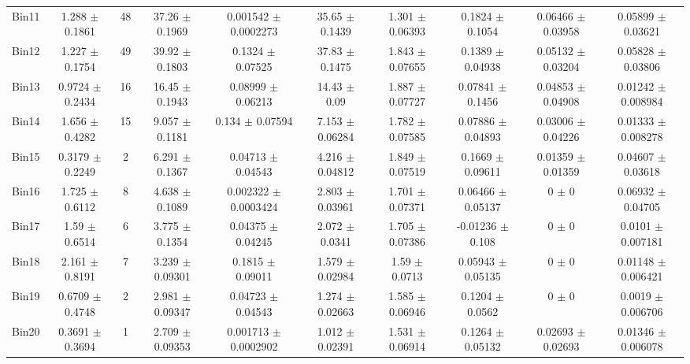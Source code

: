 \begin{tabular}{@{\extracolsep{4pt}}lccccccccc@{}}
     Bin11 & 1.288 $\pm$ 0.1861 & 48 & 37.26 $\pm$ 0.1969 & 0.001542 $\pm$ 0.0002273 & 35.65 $\pm$ 0.1439 & 1.301 $\pm$ 0.06393 & 0.1824 $\pm$ 0.1054 & 0.06466 $\pm$ 0.03958 & 0.05899 $\pm$ 0.03621 \\ 
     Bin12 & 1.227 $\pm$ 0.1754 & 49 & 39.92 $\pm$ 0.1803 & 0.1324 $\pm$ 0.07525 & 37.83 $\pm$ 0.1475 & 1.843 $\pm$ 0.07655 & 0.1389 $\pm$ 0.04938 & 0.05132 $\pm$ 0.03204 & 0.05828 $\pm$ 0.03806 \\ 
     Bin13 & 0.9724 $\pm$ 0.2434 & 16 & 16.45 $\pm$ 0.1943 & 0.08999 $\pm$ 0.06213 & 14.43 $\pm$ 0.09 & 1.887 $\pm$ 0.07727 & 0.07841 $\pm$ 0.1456 & 0.04853 $\pm$ 0.04908 & 0.01242 $\pm$ 0.008984 \\ 
     Bin14 & 1.656 $\pm$ 0.4282 & 15 & 9.057 $\pm$ 0.1181 & 0.134 $\pm$ 0.07594 & 7.153 $\pm$ 0.06284 & 1.782 $\pm$ 0.07585 & 0.07886 $\pm$ 0.04893 & 0.03006 $\pm$ 0.04226 & 0.01333 $\pm$ 0.008278 \\ 
     Bin15 & 0.3179 $\pm$ 0.2249 & 2 & 6.291 $\pm$ 0.1367 & 0.04713 $\pm$ 0.04543 & 4.216 $\pm$ 0.04812 & 1.849 $\pm$ 0.07519 & 0.1669 $\pm$ 0.09611 & 0.01359 $\pm$ 0.01359 & 0.04607 $\pm$ 0.03618 \\ 
     Bin16 & 1.725 $\pm$ 0.6112 & 8 & 4.638 $\pm$ 0.1089 & 0.002322 $\pm$ 0.0003424 & 2.803 $\pm$ 0.03961 & 1.701 $\pm$ 0.07371 & 0.06466 $\pm$ 0.05137 & 0 $\pm$ 0 & 0.06932 $\pm$ 0.04705 \\ 
     Bin17 & 1.59 $\pm$ 0.6514 & 6 & 3.775 $\pm$ 0.1354 & 0.04375 $\pm$ 0.04245 & 2.072 $\pm$ 0.0341 & 1.705 $\pm$ 0.07386 & -0.01236 $\pm$ 0.108 & 0 $\pm$ 0 & 0.0101 $\pm$ 0.007181 \\ 
     Bin18 & 2.161 $\pm$ 0.8191 & 7 & 3.239 $\pm$ 0.09301 & 0.1815 $\pm$ 0.09011 & 1.579 $\pm$ 0.02984 & 1.59 $\pm$ 0.0713 & 0.05943 $\pm$ 0.05135 & 0 $\pm$ 0 & 0.01148 $\pm$ 0.006421 \\ 
     Bin19 & 0.6709 $\pm$ 0.4748 & 2 & 2.981 $\pm$ 0.09347 & 0.04723 $\pm$ 0.04543 & 1.274 $\pm$ 0.02663 & 1.585 $\pm$ 0.06946 & 0.1204 $\pm$ 0.0562 & 0 $\pm$ 0 & 0.0019 $\pm$ 0.006706 \\ 
     Bin20 & 0.3691 $\pm$ 0.3694 & 1 & 2.709 $\pm$ 0.09353 & 0.001713 $\pm$ 0.0002902 & 1.012 $\pm$ 0.02391 & 1.531 $\pm$ 0.06914 & 0.1264 $\pm$ 0.05132 & 0.02693 $\pm$ 0.02693 & 0.01346 $\pm$ 0.006078 \\ 
\hline\hline
  \end{tabular}

